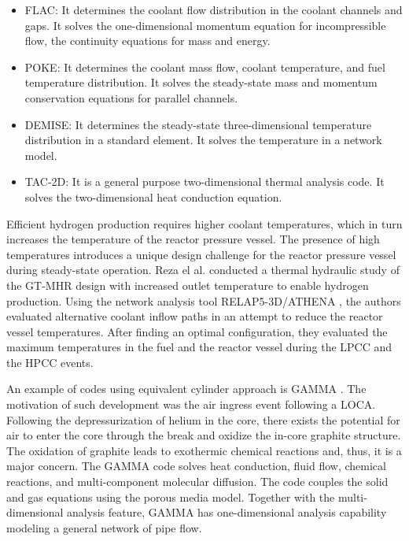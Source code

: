 \documentclass[11pt,letterpaper]{article}
\begin{document}
\begin{itemize}
\item FLAC: It determines the coolant flow distribution in the coolant channels and gaps.
It solves the one-dimensional momentum equation for incompressible flow, the continuity equations for mass and energy.

\item POKE: It determines the coolant mass flow, coolant temperature, and fuel temperature distribution.
It solves the steady-state mass and momentum conservation equations for parallel channels.

\item DEMISE: It determines the steady-state three-dimensional temperature distribution in a standard element.
It solves the temperature in a network model.

\item TAC-2D: It is a general purpose two-dimensional thermal analysis code.
It solves the two-dimensional heat conduction equation.
\end{itemize}







Efficient hydrogen production requires higher coolant temperatures, which in turn increases the temperature of the reactor pressure vessel.
The presence of high temperatures introduces a unique design challenge for the reactor pressure vessel during steady-state operation.
Reza el al. \cite{reza_design_2006} conducted a thermal hydraulic study of the GT-MHR design \cite{general_atomics_gas_1996} with increased outlet temperature to enable hydrogen production.
Using the network analysis tool RELAP5-3D/ATHENA \cite{inl_relap5-3dathena_2005}, the authors evaluated alternative coolant inflow paths in an attempt to reduce the reactor vessel temperatures.
After finding an optimal configuration, they evaluated the maximum temperatures in the fuel and the reactor vessel during the \gls{LPCC} and the \gls{HPCC} events.

An example of codes using equivalent cylinder approach is GAMMA \cite{no_multi-component_2007}.
The motivation of such development was the air ingress event following a LOCA.
Following the depressurization of helium in the core, there exists the potential for air to enter the core through the break and oxidize the in-core graphite structure.
The oxidation of graphite leads to exothermic chemical reactions and, thus, it is a major concern.
The GAMMA code solves heat conduction, fluid flow, chemical reactions, and multi-component molecular diffusion.
The code couples the solid and gas equations using the porous media model.
Together with the multi-dimensional analysis feature, GAMMA has one-dimensional analysis capability modeling a general network of pipe flow.
\end{document}
